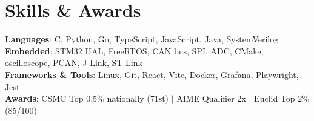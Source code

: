 \documentclass[letterpaper,11pt]{article}
\begin{document}
\section{Skills \& Awards}
 \begin{itemize}[leftmargin=0.15in, label={}]
    \small{\item{
    \textbf{Languages}{: C, Python, Go, TypeScript, JavaScript, Java, SystemVerilog} \\
    \textbf{Embedded}{: STM32 HAL, FreeRTOS, CAN bus, SPI, ADC, CMake, oscilloscope, PCAN, J-Link, ST-Link} \\
    \textbf{Frameworks \& Tools}{: Linux, Git, React, Vite, Docker, Grafana, Playwright, Jest} \\
    \textbf{Awards}{: CSMC Top 0.5\% nationally (71st) $|$ AIME Qualifier 2x $|$ Euclid Top 2\% (85/100)}
    }}
 \end{itemize}
\end{document}
